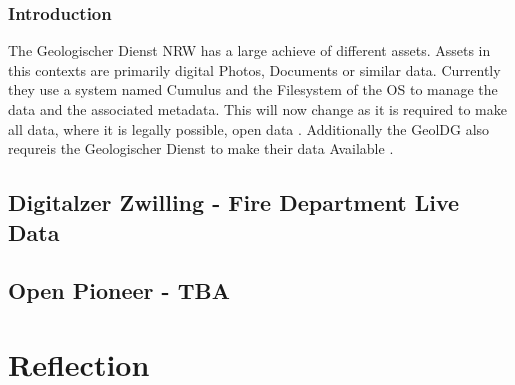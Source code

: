 \documentclass[11pt, titlepage, a4paper]{article}
\begin{document}
\subsubsection{Introduction}
The Geologischer Dienst NRW has a large achieve of different assets. Assets in this contexts are primarily digital Photos, Documents or similar data. Currently they use a system named Cumulus and the Filesystem of the OS to manage the data and the associated metadata. This will now change as it is required to make all data, where it is legally possible, open data \cite{GesetzZurForderung2017}.
Additionally the GeolDG also requreis the Geologischer Dienst to make their data Available \cite{GesetzZurStaatlichen}.
\subsection{Digitalzer Zwilling - Fire Department Live Data}
\subsection{Open Pioneer - TBA}
\section{Reflection}

\clearpage
\printbibliography
\end{document}
